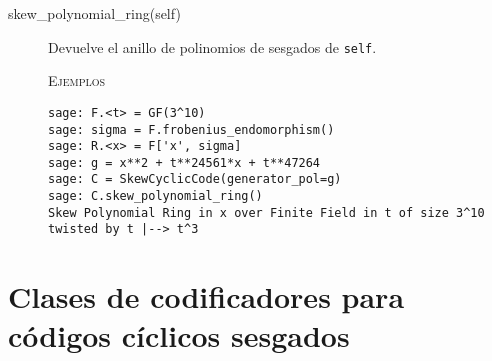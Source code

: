 \begin{description}
\begin{description}
    \end{description}

    \begin{description}
    \item[skew\_polynomial\_ring(self)]
    Devuelve el anillo de polinomios de sesgados de \texttt{self}.

    \textsc{Ejemplos}
    \begin{lstlisting}
sage: F.<t> = GF(3^10)
sage: sigma = F.frobenius_endomorphism()
sage: R.<x> = F['x', sigma]
sage: g = x**2 + t**24561*x + t**47264
sage: C = SkewCyclicCode(generator_pol=g)
sage: C.skew_polynomial_ring()
Skew Polynomial Ring in x over Finite Field in t of size 3^10 twisted by t |--> t^3
    \end{lstlisting}

    \end{description}

\end{description}

\section{Clases de codificadores para códigos cíclicos sesgados}

